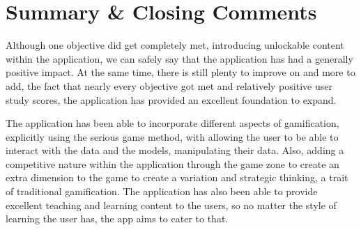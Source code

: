 
	\section{Summary \& Closing Comments}
	
	Although one objective did get completely met, introducing unlockable content within the application, we can safely say that the application has had a generally positive impact. At the same time, there is still plenty to improve on and more to add, the fact that nearly every objective got met and relatively positive user study scores, the application has provided an excellent foundation to expand. 
	
	The application has been able to incorporate different aspects of gamification, explicitly using the serious game method, with allowing the user to be able to interact with the data and the models, manipulating their data. Also, adding a competitive nature within the application through the game zone to create an extra dimension to the game to create a variation and strategic thinking, a trait of traditional gamification. The application has also been able to provide excellent teaching and learning content to the users, so no matter the style of learning the user has, the app aims to cater to that.